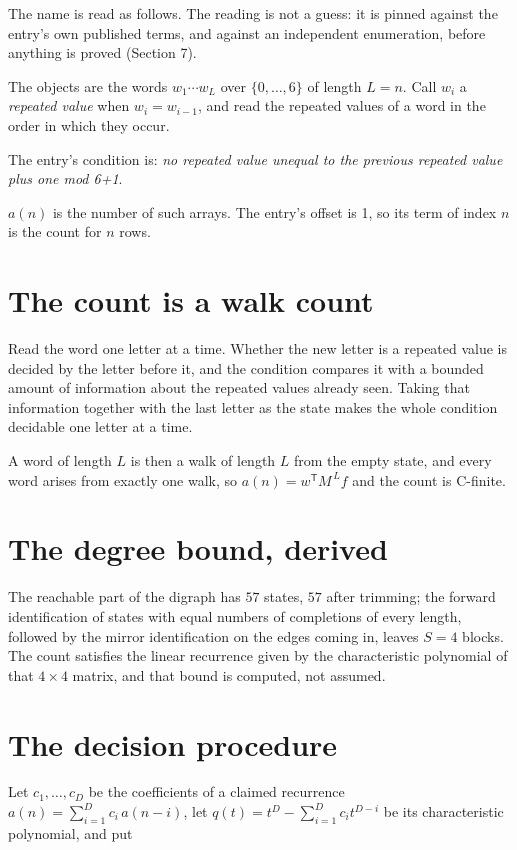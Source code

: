 \documentclass[11pt]{article}
\theoremstyle{definition}
\begin{document}
The name is read as follows. The reading is not a guess: it is pinned against the entry's own published terms, and against an independent enumeration, before anything is proved (Section 7).

The objects are the words $w_1\cdots w_L$ over $\{0,\dots,6\}$ of length $L = n$. Call $w_i$ a {\itshape repeated value} when $w_i = w_{i-1}$, and read the repeated values of a word in the order in which they occur.

The entry's condition is: {\itshape no repeated value unequal to the previous repeated value plus one mod 6+1}.

$a(n)$ is the number of such arrays. The entry's offset is 1, so its term of index $n$ is the count for $n$ rows.

\section{The count is a walk count}

Read the word one letter at a time. Whether the new letter is a repeated value is decided by the letter before it, and the condition compares it with a bounded amount of information about the repeated values already seen. Taking that information together with the last letter as the state makes the whole condition decidable one letter at a time.

A word of length $L$ is then a walk of length $L$ from the empty state, and every word arises from exactly one walk, so $a(n) = w^{\mathsf T}M^{\,L}f$ and the count is C-finite.

\section{The degree bound, derived}

The reachable part of the digraph has $57$ states, $57$ after trimming; the forward identification of states with equal numbers of completions of every length, followed by the mirror identification on the edges coming in, leaves $S = 4$ blocks. The count satisfies the linear recurrence given by the characteristic polynomial of that $4\times4$ matrix, and that bound is computed, not assumed.

\section{The decision procedure}

Let $c_1,\dots,c_D$ be the coefficients of a claimed recurrence $a(n) = \sum_{i=1}^{D} c_i\,a(n-i)$, let $q(t) = t^{D} - \sum_{i=1}^{D} c_i t^{D-i}$ be its characteristic polynomial, and put
\end{document}
